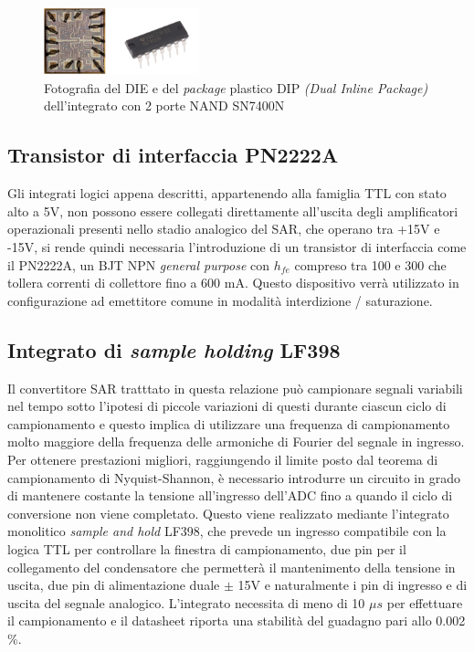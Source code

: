 \documentclass[journal]{IEEEtran}
\begin{document}
\begin{figure}[H]%
\begin{center}
\includegraphics[width=0.40\textwidth]{lab-reports/Schematics-and-graphics/SN7400N.png}
\caption{Fotografia del DIE e del \textit{package} plastico DIP \textit{(Dual Inline Package)} dell'integrato con 2 porte NAND SN7400N}
\label{fig:integrated_nand}
\end{center}
\end{figure}

\subsection{Transistor di interfaccia PN2222A}
Gli integrati logici appena descritti, appartenendo alla famiglia TTL con stato alto a 5V, non possono essere collegati direttamente all'uscita degli amplificatori operazionali presenti nello stadio analogico del SAR, che operano tra +15V e -15V, si rende quindi necessaria l'introduzione di un transistor di interfaccia come il PN2222A, un BJT NPN \textit{general purpose} con $h_{fe}$ compreso tra 100 e 300 che tollera correnti di collettore fino a 600 mA. Questo dispositivo verrà utilizzato in configurazione ad emettitore comune in modalità interdizione / saturazione.
\cite{I}


\subsection{Integrato di \textit{sample holding} LF398}
Il convertitore SAR tratttato in questa relazione può campionare segnali variabili nel tempo sotto l'ipotesi di piccole variazioni di questi durante ciascun ciclo di campionamento e questo implica di utilizzare una frequenza di campionamento molto maggiore della frequenza delle armoniche di Fourier del segnale in ingresso. Per ottenere prestazioni migliori, raggiungendo il limite posto dal teorema di campionamento di Nyquist-Shannon, è necessario introdurre un circuito in grado di mantenere costante la tensione all'ingresso dell'ADC fino a quando il ciclo di conversione non viene completato. Questo viene realizzato mediante l'integrato monolitico \textit{sample and hold} LF398, che prevede un ingresso compatibile con la logica TTL per controllare la finestra di campionamento, due pin per il collegamento del condensatore che permetterà il mantenimento della tensione in uscita, due pin di alimentazione duale $\pm$ 15V e naturalmente i pin di ingresso e di uscita del segnale analogico. L'integrato necessita di meno di 10 $\mu s$ per effettuare il campionamento e il datasheet riporta una stabilità del guadagno pari allo 0.002 \%.
\cite{J}
\end{document}
